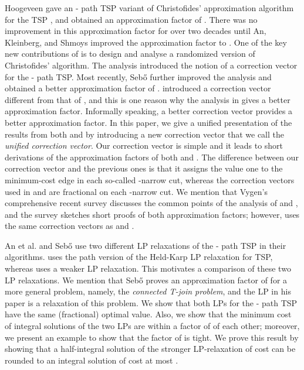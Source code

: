 \documentclass[11pt]{article}
\begin{document}
Hoogeveen \cite{hoogeveen91} gave an - path TSP variant of
Christofides' approximation algorithm for the TSP \cite{christofides76}, and obtained an approximation factor
of . There was no improvement in this approximation factor
for over two decades until An, Kleinberg, and Shmoys \cite{AKS12}
improved the approximation factor to .
One of the key new contributions of \cite{AKS12} is to
design and analyse a randomized version of Christofides' algorithm.
The analysis introduced the notion of a correction vector for
the - path TSP.
Most recently, Seb\H{o} \cite{sebo13} further improved the
analysis and obtained a better approximation factor of .
\cite{sebo13} introduced a correction vector different from that
of \cite{AKS12}, and this is one reason why the analysis in \cite{sebo13}
gives a better approximation factor. Informally speaking,
a better correction vector provides a better approximation factor.
In this paper, we give a unified presentation of the results from both
\cite{AKS12} and \cite{sebo13} by introducing a new correction vector
that we call the \emph{unified correction vector}.
Our correction vector is simple and it leads to short derivations of
the approximation factors of both \cite{AKS12} and \cite{sebo13}. The difference between our correction vector and
the previous ones is that it assigns the value one to the minimum-cost
edge in each so-called -narrow cut, whereas the correction vectors used in \cite{AKS12} and \cite{sebo13} are fractional
on each -narrow cut. We mention that Vygen's \cite{vygen13} comprehensive recent survey discusses
the common points of the analysis of \cite{AKS12} and \cite{sebo13},
and the survey sketches short proofs of both approximation factors;
however, \cite{vygen13} uses the same correction vectors as \cite{AKS12} and \cite{sebo13}.



An et al. \cite{AKS12} and Seb\H{o} \cite{sebo13} use two
different LP relaxations of the - path TSP in their algorithms.
\cite{AKS12} uses the path version of the Held-Karp LP relaxation for TSP,
whereas \cite{sebo13} uses a weaker LP relaxation. This motivates a comparison of these two LP relaxations. We mention that Seb\H{o} proves an approximation factor of  for a more
general problem, namely, the \emph{connected T-join problem}, and the LP in
his paper is a relaxation of this problem.
We show that both LPs for the - path TSP have the same (fractional) optimal value.
Also, we show that the minimum cost of integral solutions of the
two LPs are within a factor of  of each other; moreover,
we present an example to show that the factor of  is tight.
We prove this result by showing that
a half-integral solution of the stronger LP-relaxation of cost 
can be rounded to an integral solution of cost at most .
\end{document}
